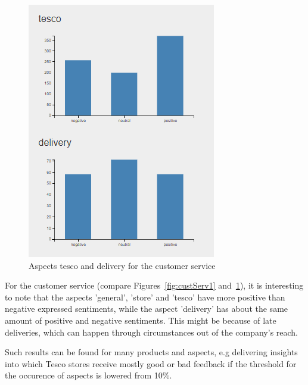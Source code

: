 \documentclass[10pt,a4paper]{article}
\begin{document}
\begin{figure}[!h]
\begin{minipage}[b]{0.48\textwidth}
    \includegraphics[width=\textwidth]{data/custService2}
    \caption{Aspects tesco and delivery for the customer service}
	\label{fig:custServ2}
  \end{minipage}
\end{figure}		
		
		For the customer service (compare Figures~\ref{fig:custServ1} and~\ref{fig:custServ2}), it is interesting to note that the aspects 'general', 'store' and 'tesco' have more positive than negative expressed sentiments, while the aspect 'delivery' has about the same amount of positive and negative sentiments. This might be because of late deliveries, which can happen through circumstances out of the company's reach.
		
		Such results can be found for many products and aspects, e.g delivering insights into which Tesco stores receive mostly good or bad feedback if the threshold for the occurence of aspects is lowered from 10\%.
	
\end{document}
